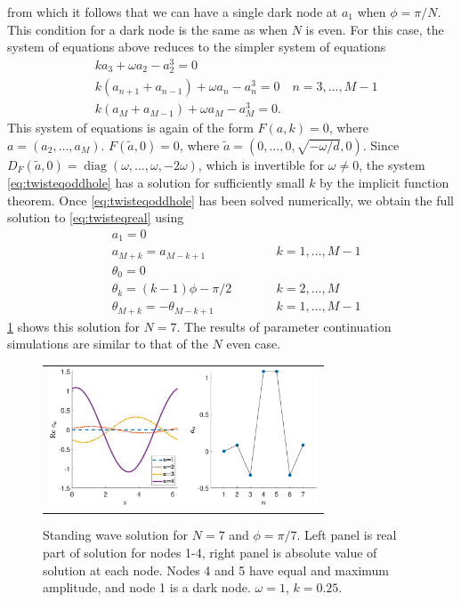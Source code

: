 \documentclass[reprint, amsmath,amssymb,aps]{revtex4-2}
\DeclareMathOperator{\diag}{diag}
\begin{document}
from which it follows that we can have a single dark node at $a_1$ when $\phi = \pi/N$. This condition for a dark node is the same as when $N$ is even. For this case, the system of equations above reduces to the simpler system of equations
\begin{equation}\label{eq:twisteqoddhole}
\begin{aligned}
& k a_3 + \omega a_2 - a_2^3 = 0\\
&k( a_{n+1} + a_{n-1} ) + \omega a_n - a_n^3 = 0 \quad n = 3, \dots, M-1 \\
&k ( a_M + a_{M-1} ) + \omega a_M - a_M^3 = 0.
\end{aligned}
\end{equation}
This system of equations is again of the form $F(a,k) = 0$, where $a = (a_2, \dots, a_M)$. $F(\tilde{a}, 0) = 0$, where $\tilde{a} = (0, \dots, 0, \sqrt{-\omega/d}, 0)$. Since $D_F(\tilde{a}, 0) = \diag(\omega, \dots, \omega, -2\omega)$, which is invertible for $\omega \neq 0$, the system \cref{eq:twisteqoddhole} has a solution for sufficiently small $k$ by the implicit function theorem. Once \cref{eq:twisteqoddhole} has been solved numerically, we obtain the full solution to \cref{eq:twisteqreal} using
\begin{align*}
&a_1 = 0 \\
&a_{M+k} = a_{M-k+1} && \qquad k = 1, \dots, M-1 \\
&\theta_0 = 0 \\
&\theta_k = (k-1)\phi - \pi/2 && \qquad k = 2, \dots, M \\
&\theta_{M+k} = -\theta_{M-k+1} && \qquad k = 1, \dots, M-1
\end{align*}
\cref{fig:oddhole7} shows this solution for $N=7$. The results of parameter continuation simulations are similar to that of the $N$ even case.
\begin{figure}
\begin{center}
\begin{tabular}{c}
\includegraphics[width=8cm]{oddhole7.eps}
\end{tabular}
\end{center}
\caption{Standing wave solution for $N = 7$ and $\phi = \pi/7$. Left panel is real part of solution for nodes 1-4, right panel is absolute value of solution at each node. Nodes 4 and 5 have equal and maximum amplitude, and node 1 is a dark node. $\omega = 1$, $k = 0.25$.}
\label{fig:oddhole7}
\end{figure}
\end{document}

